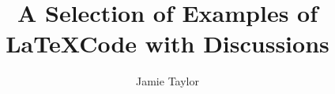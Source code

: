 \documentclass[11pt, a4paper, twoside]{report}
\begin{document}
\title{A Selection of Examples of \LaTeX Code with Discussions}
\author {Jamie Taylor}
\maketitle


\begin{abstract}


% 

% 



\end{abstract}



\tableofcontents



\end{document}
